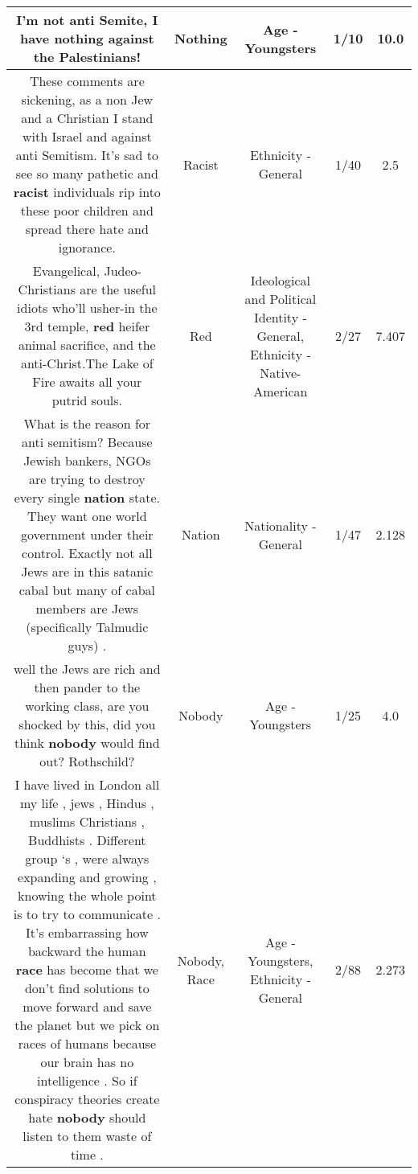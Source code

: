 \documentclass[11pt]{article}
\newlength\mylength
\begin{document}
\begin{center}
\begin{longtable}{|C{.65\mylength}|C{.30\mylength}|C{.12\mylength}|C{.12\mylength}|C{.12\mylength}|}
  \small I'm not anti Semite, I have \textbf{nothing} against the Palestinians!\normalsize   & Nothing & Age - Youngsters & 1/10 & 10.0 \\  \hline
  \small These comments are sickening, as a non Jew and a Christian I stand with Israel and against anti Semitism. It's sad to see so many pathetic and \textbf{racist} individuals rip into these poor children and spread there hate and ignorance.\normalsize   & Racist & Ethnicity - General & 1/40 & 2.5 \\  \hline
  \small Evangelical, Judeo-Christians are the useful idiots who'll usher-in the 3rd temple, \textbf{r\textbf{ed}} heifer animal sacrifice, and the anti-Christ.The Lake of Fire awaits all your putrid souls.\normalsize   & Red &  Ideological and Political Identity - General, Ethnicity - Native-American & 2/27 & 7.407 \\  \hline
  \small What is the reason for anti semitism? Because Jewish bankers,  NGOs are trying to destroy every single \textbf{nation} state. They want one world government under their control. Exactly not all Jews are in this satanic cabal but many of cabal members are Jews (specifically Talmudic guys) .\normalsize   & Nation & Nationality - General & 1/47 & 2.128 \\  \hline
  \small well the Jews are rich and then pander to the working class, are you shocked by this, did you think \textbf{nobody} would find out?  Rothschild?\normalsize   & Nobody & Age - Youngsters & 1/25 & 4.0 \\  \hline
  \small I have lived in London all my life , jews , Hindus , muslims Christians , Buddhists . Different group ‘s , were always expanding and growing , knowing the whole point is to try to communicate . It's embarrassing how backward the human \textbf{race} has become that we don't find solutions to move forward and save the planet but we pick on races of humans because our brain has no intelligence . So if conspiracy theories create hate \textbf{nobody} should listen to them waste of time .\normalsize   & Nobody, Race & Age - Youngsters, Ethnicity - General & 2/88 & 2.273 \\  \hline

\end{longtable}
\end{center}
\end{document}
